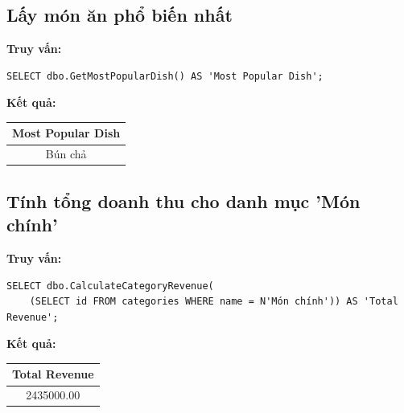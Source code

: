 \documentclass{article}
\begin{document}
\subsection{Lấy món ăn phổ biến nhất}

\textbf{Truy vấn:}

\begin{verbatim}
SELECT dbo.GetMostPopularDish() AS 'Most Popular Dish';
\end{verbatim}

\textbf{Kết quả:}
\begin{longtable}{|c|}
\hline
Most Popular Dish \\
\hline
Bún chả \\
\hline
\end{longtable}

\subsection{Tính tổng doanh thu cho danh mục 'Món chính'}

\textbf{Truy vấn:}

\begin{verbatim}
SELECT dbo.CalculateCategoryRevenue(
    (SELECT id FROM categories WHERE name = N'Món chính')) AS 'Total Revenue';
\end{verbatim}

\textbf{Kết quả:}
\begin{longtable}{|c|}
\hline
Total Revenue \\
\hline
2435000.00 \\
\hline
\end{longtable}
\end{document}
